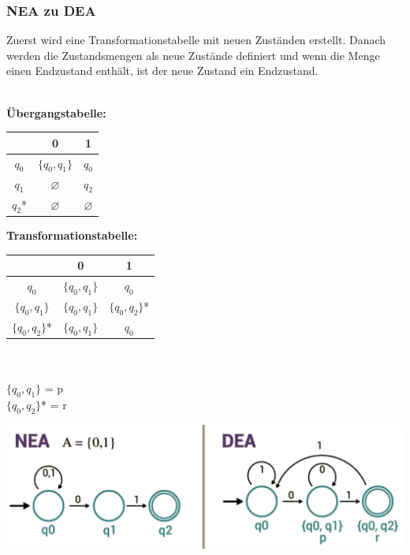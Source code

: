 \documentclass[12pt,a4paper]{article}
\begin{document}
	\subsubsection{NEA zu DEA}
	Zuerst wird eine Transformationstabelle mit neuen Zuständen erstellt. Danach werden die Zustandsmengen als neue Zustände definiert und wenn die Menge einen Endzustand enthält, ist der neue Zustand ein Endzustand.\\\\
	\begin{minipage}[c]{0.5\textwidth}
		\textbf{Übergangstabelle:}\\
		\begin{tabular}[h]{c | c | c}
			& 0 & 1\\
			\hline
			$q_0$ & $\{q_0, q_1\}$ & $q_0$\\
			\hline
			$q_1$ & $\varnothing$ & $q_2$\\
			\hline
			$q_2$* & $\varnothing$ & $\varnothing $
		\end{tabular}
	\end{minipage}
	\hfill
	\begin{minipage}[c]{0.5\textwidth}
		\textbf{Transformationstabelle:}\\
		\begin{tabular}[h]{c | c | c}
			& 0 & 1\\
			\hline
			$q_0$ & $\{q_0, q_1\}$ & $q_0$\\
			\hline
			$\{q_0, q_1\}$ & $\{q_0, q_1\}$ & $\{q_0, q_2\}$*\\
			\hline
			$\{q_0, q_2\}$* & $\{q_0, q_1\}$ & $q_0$
		\end{tabular}\\\\
		$\{q_0, q_1\}$ = p\\
		$\{q_0, q_2\}$* = r
	\end{minipage}
	\includegraphics[width=\textwidth]{Bilder/NEAzuDEA.PNG}
\end{document}
